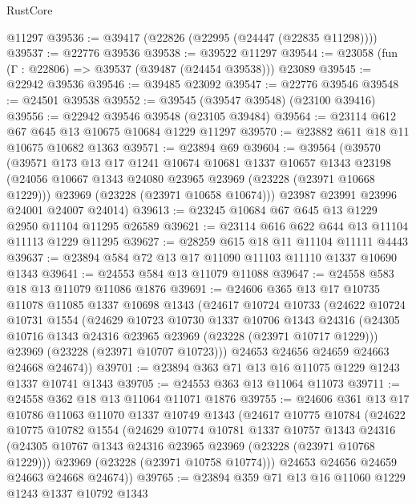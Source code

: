 \begin{lexlean}{RustCore}
\begin{coremodule}
    @11297
@39536 := @39417 (@22826 (@22995 (@24447 (@22835 @11298))))
@39537 := @22776 @39536
@39538 := @39522 @11297
@39544 := @23058 (fun (Γ : @22806) => @39537 (@39487 (@24454 @39538))) @23089
@39545 := @22942 @39536
@39546 := @39485 @23092
@39547 := @22776 @39546
@39548 := @24501 @39538
@39552 := @39545 (@39547 @39548) (@23100 @39416)
@39556 := @22942 @39546 @39548 (@23105 @39484)
@39564 := @23114 @612 @67 @645 @13 @10675 @10684 @1229 @11297
@39570 := @23882 @611 @18 @11 @10675 @10682 @1363
@39571 := @23894 @69
@39604 := @39564
    (@39570
      (@39571
        @173
        @13
        @17
        @1241
        @10674
        @10681
        @1337
        @10657
        @1343
        @23198
        (@24056 @10667 @1343 @24080 @23965 @23969 (@23228 (@23971 @10668 @1229)))
        @23969
        (@23228 (@23971 @10658 @10674)))
      @23987
      @23991
      @23996
      @24001
      @24007
      @24014)
@39613 := @23245 @10684 @67 @645 @13 @1229 @2950 @11104 @11295 @26589
@39621 := @23114 @616 @622 @644 @13 @11104 @11113 @1229 @11295
@39627 := @28259 @615 @18 @11 @11104 @11111 @4443
@39637 := @23894 @584 @72 @13 @17 @11090 @11103 @11110 @1337 @10690 @1343
@39641 := @24553 @584 @13 @11079 @11088
@39647 := @24558 @583 @18 @13 @11079 @11086 @1876
@39691 := @24606
    @365
    @13
    @17
    @10735
    @11078
    @11085
    @1337
    @10698
    @1343
    (@24617
      @10724
      @10733
      (@24622
        @10724
        @10731
        @1554
        (@24629
          @10723
          @10730
          @1337
          @10706
          @1343
          @24316
          (@24305 @10716 @1343 @24316 @23965 @23969 (@23228 (@23971 @10717 @1229)))
          @23969
          (@23228 (@23971 @10707 @10723)))
        @24653
        @24656
        @24659
        @24663
        @24668
        @24674))
@39701 := @23894 @363 @71 @13 @16 @11075 @1229 @1243 @1337 @10741 @1343
@39705 := @24553 @363 @13 @11064 @11073
@39711 := @24558 @362 @18 @13 @11064 @11071 @1876
@39755 := @24606
    @361
    @13
    @17
    @10786
    @11063
    @11070
    @1337
    @10749
    @1343
    (@24617
      @10775
      @10784
      (@24622
        @10775
        @10782
        @1554
        (@24629
          @10774
          @10781
          @1337
          @10757
          @1343
          @24316
          (@24305 @10767 @1343 @24316 @23965 @23969 (@23228 (@23971 @10768 @1229)))
          @23969
          (@23228 (@23971 @10758 @10774)))
        @24653
        @24656
        @24659
        @24663
        @24668
        @24674))
@39765 := @23894 @359 @71 @13 @16 @11060 @1229 @1243 @1337 @10792 @1343

\end{coremodule}
\end{lexlean}
